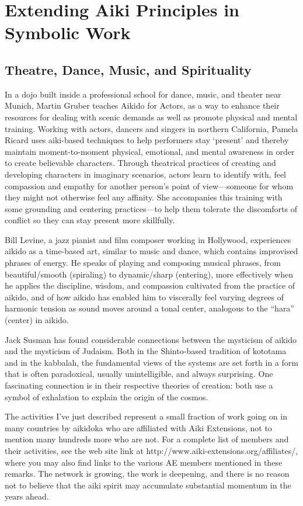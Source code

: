 \section*{Extending Aiki Principles in Symbolic Work}

\subsection*{Theatre, Dance, Music, and Spirituality}

In a dojo built inside a professional school for dance, music, and theater near Munich, Martin Gruber teaches Aikido for Actors, as a way to enhance their resources for dealing with scenic demands as well as promote physical and mental training. Working with actors, dancers and singers in northern California, Pamela Ricard uses aiki-based techniques to help performers stay `present' and thereby maintain moment-to-moment physical, emotional, and mental awareness in order to create believable characters. Through theatrical practices of creating and developing characters in imaginary scenarios, actors learn to identify with, feel compassion and empathy for another person's point of view---someone for whom they might not otherwise feel any affinity. She accompanies this training with some grounding and centering practices---to help them tolerate the discomforts of conflict so they can stay present more skillfully.

Bill Levine, a jazz pianist and film composer working in Hollywood, experiences aikido as a time-based art, similar to music and dance, which contains improvised phrases of energy. He speaks of playing and composing musical phrases, from beautiful/smooth (spiraling) to dynamic/sharp (entering), more effectively when he applies the discipline, wisdom, and compassion cultivated from the practice of aikido, and of how aikido has enabled him to viscerally feel varying degrees of harmonic tension as sound moves around a tonal center, analogous to the ``hara'' (center) in aikido.

Jack Susman has found considerable connections between the mysticism of aikido and the mysticism of Judaism. Both in the Shinto-based tradition of kototama and in the kabbalah, the fundamental views of the systems are set forth in a form that is often paradoxical, usually unintelligible, and always surprising. One fascinating connection is in their respective theories of creation: both use a symbol of exhalation to explain the origin of the cosmos.

The activities I've just described represent a small fraction of work going on in many countries by aikidoka who are affiliated with Aiki Extensions, not to mention many hundreds more who are not. For a complete list of members and their activities, see the web site link at http://www.aiki-extensions.org/affiliates/, where you may also find links to the various AE members mentioned in these remarks. The network is growing, the work is deepening, and there is no reason not to believe that the aiki spirit may accumulate substantial momentum in the years ahead.

